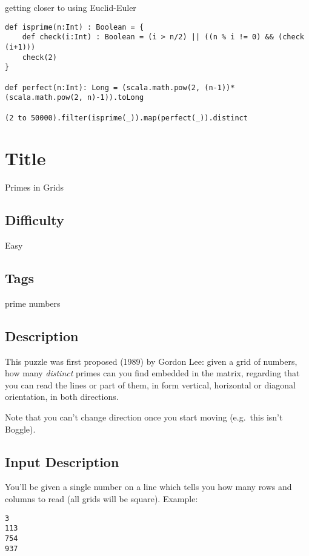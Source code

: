getting closer to using Euclid-Euler

\begin{verbatim}
def isprime(n:Int) : Boolean = {
    def check(i:Int) : Boolean = (i > n/2) || ((n % i != 0) && (check (i+1)))
    check(2)
}

def perfect(n:Int): Long = (scala.math.pow(2, (n-1))*(scala.math.pow(2, n)-1)).toLong

(2 to 50000).filter(isprime(_)).map(perfect(_)).distinct
\end{verbatim}

\section{Title}\label{title-36}

Primes in Grids

\subsection{Difficulty}\label{difficulty-35}

Easy

\subsection{Tags}\label{tags-36}

prime numbers

\subsection{Description}\label{description-36}

This puzzle was first proposed (1989) by Gordon Lee: given a grid of
numbers, how many \emph{distinct} primes can you find embedded in the
matrix, regarding that you can read the lines or part of them, in form
vertical, horizontal or diagonal orientation, in both directions.

Note that you can't change direction once you start moving (e.g.~this
isn't Boggle).

\subsection{Input Description}\label{input-description-25}

You'll be given a single number on a line which tells you how many rows
and columns to read (all grids will be square). Example:

\begin{verbatim}
3 
113
754
937
\end{verbatim}

